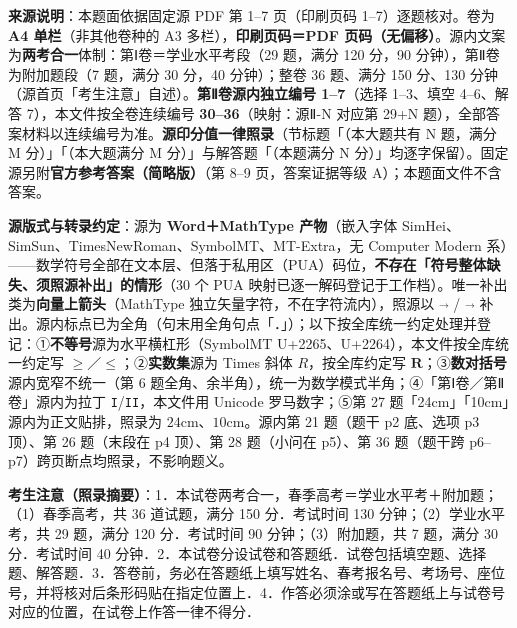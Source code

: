


\begin{gktip}
\textbf{来源说明}：本题面依据固定源 PDF 第 1–7 页（印刷页码 1–7）逐题核对。卷为 \textbf{A4 单栏}（非其他卷种的 A3 多栏），\textbf{印刷页码＝PDF 页码（无偏移）}。源内文案为\textbf{两考合一}体制：第Ⅰ卷＝学业水平考段（29 题，满分 120 分，90 分钟），第Ⅱ卷为附加题段（7 题，满分 30 分，40 分钟）；整卷 36 题、满分 150 分、130 分钟（源首页「考生注意」自述）。\textbf{第Ⅱ卷源内独立编号 1–7}（选择 1–3、填空 4–6、解答 7），本文件按全卷连续编号 \textbf{30–36}（映射：源Ⅱ-N 对应第 29+N 题），全部答案材料以连续编号为准。\textbf{源印分值一律照录}（节标题「（本大题共有 N 题，满分 M 分）」「（本大题满分 M 分）」与解答题「（本题满分 N 分）」均逐字保留）。固定源另附\textbf{官方参考答案（简略版）}（第 8–9 页，答案证据等级 A）；本题面文件不含答案。

\textbf{源版式与转录约定}：源为 \textbf{Word＋MathType 产物}（嵌入字体 SimHei、SimSun、TimesNewRoman、SymbolMT、MT-Extra，无 Computer Modern 系）——数学符号全部在文本层、但落于私用区（PUA）码位，\textbf{不存在「符号整体缺失、须照源补出」的情形}（30 个 PUA 映射已逐一解码登记于工作档）。唯一补出类为\textbf{向量上箭头}（MathType 独立矢量字符，不在字符流内），照源以 \(\vec{}\) / \(\overrightarrow{}\) 补出。源内标点已为全角（句末用全角句点「．」）；以下按全库统一约定处理并登记：①\textbf{不等号}源为水平横杠形（SymbolMT U+2265、U+2264），本文件按全库统一约定写 \(\geqslant\)／\(\leqslant\)；②\textbf{实数集}源为 Times 斜体 \(R\)，按全库约定写 \(\mathbf{R}\)；③\textbf{数对括号}源内宽窄不统一（第 6 题全角、余半角），统一为数学模式半角；④「第Ⅰ卷／第Ⅱ卷」源内为拉丁 \texttt{I}/\texttt{II}，本文件用 Unicode 罗马数字；⑤第 27 题「24cm」「10cm」源内为正文贴排，照录为 \(24\mathrm{cm}\)、\(10\mathrm{cm}\)。源内第 21 题（题干 p2 底、选项 p3 顶）、第 26 题（末段在 p4 顶）、第 28 题（小问在 p5）、第 36 题（题干跨 p6–p7）跨页断点均照录，不影响题义。

\textbf{考生注意（照录摘要）}：1．本试卷两考合一，春季高考＝学业水平考＋附加题；（1）春季高考，共 36 道试题，满分 150 分．考试时间 130 分钟；（2）学业水平考，共 29 题，满分 120 分．考试时间 90 分钟；（3）附加题，共 7 题，满分 30 分．考试时间 40 分钟．2．本试卷分设试卷和答题纸．试卷包括填空题、选择题、解答题．3．答卷前，务必在答题纸上填写姓名、春考报名号、考场号、座位号，并将核对后条形码贴在指定位置上．4．作答必须涂或写在答题纸上与试卷号对应的位置，在试卷上作答一律不得分．
\end{gktip}

